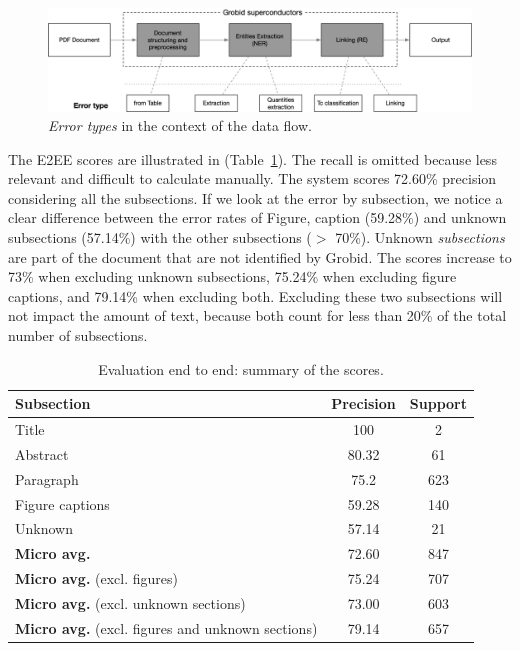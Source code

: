 \documentclass{article}
\begin{document}
\begin{figure}[ht]
\centering
\includegraphics[width=\textwidth]{error-types-3.png}
\caption{\textit{Error types} in the context of the data flow. }
\label{fig:error-types}
\end{figure}

The E2EE scores are illustrated in (Table~\ref{table:end2end-evaluation-summary}). 
The recall is omitted because less relevant and difficult to calculate manually. 
The system scores 72.60\% precision considering all the subsections. 
If we look at the error by subsection, we notice a clear difference between the error rates of Figure, caption (59.28\%) and unknown subsections (57.14\%) with the other subsections ($>$ 70\%). 
Unknown\textit{ subsections} are part of the document that are not identified by Grobid. 
The scores increase to 73\% when excluding unknown subsections, 75.24\% when excluding figure captions, and 79.14\%  when excluding both. 
Excluding these two subsections will not impact the amount of text, because both count for less than 20\% of the total number of subsections. 


\begin{table}[ht]
\centering\small
\begin{tabular}{l c c}
\toprule
\textbf{Subsection} & \textbf{Precision} & \textbf{Support} \\ 
\midrule
Title               & 100       & 2     \\
Abstract            & 80.32     & 61    \\
Paragraph           & 75.2      & 623   \\    
Figure captions     & 59.28     & 140   \\    
Unknown             & 57.14     & 21    \\
\midrule
\textbf{Micro avg.}  & 72.60     & 847   \\
\textbf{Micro avg.} (excl. figures)  & 75.24     & 707   \\ 
\textbf{Micro avg.} (excl. unknown sections)  & 73.00     & 603   \\ 
\textbf{Micro avg.} (excl. figures and unknown sections)  & 79.14     & 657   \\ 
\bottomrule
\end{tabular}
\caption{Evaluation end to end: summary of the scores. }
\label{table:end2end-evaluation-summary}
\end{table}
\end{document}
